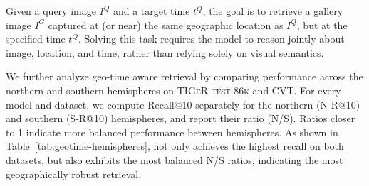 Given a query image $I^Q$ and a target time $t^Q$, the goal is to retrieve a gallery image $I^G$ captured at (or near) the same geographic location as $I^Q$, but at the specified time $t^Q$. 
Solving this task requires the model to reason jointly about image, location, and time, rather than relying solely on visual semantics. 


We further analyze geo-time aware retrieval by comparing performance across the northern and southern hemispheres on \textsc{TIGeR-test-86k} and CVT.  
For every model and dataset, we compute Recall@10 separately for the northern (N-R@10) and southern (S-R@10) hemispheres, and report their ratio (N/S). 
Ratios closer to 1 indicate more balanced performance between hemispheres. 
As shown in Table~\ref{tab:geotime-hemispheres}, \tiger not only achieves the highest recall on both datasets, but also exhibits the most balanced N/S ratios, indicating the most geographically robust retrieval.

